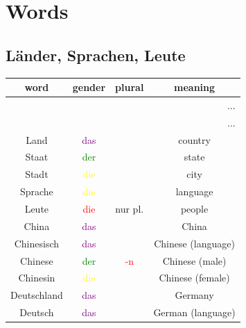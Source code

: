 \chapter{Words}
\section{Länder, Sprachen, Leute}
\begin{center}
    \begin{longtable} {|c|c|c|c|}
        \hline
        \rowcolor{gray}
        word           & gender                    & plural              & meaning              \\
        \hline
        \endfirsthead
        \multicolumn{4}{r}{...}                                                                 \\
        \hline
        \endhead
        \hline
        \multicolumn{4}{r}{...}                                                                 \\
        \endfoot
        \hline
        \endlastfoot
        \hline
        Land           & \textcolor{purple}{das}   &                     & country              \\
        Staat          & \textcolor{green}{der}    &                     & state                \\
        Stadt          & \textcolor{yellow}{die}   &                     & city                 \\
        Sprache        & \textcolor{yellow}{die}   &                     & language             \\
        Leute          & \textcolor{red}{die}      & nur pl.             & people               \\
        \hline
        China          & \textcolor{purple}{das}   &                     & China                \\
        Chinesisch     & \textcolor{purple}{das}   &                     & Chinese (language)   \\
        Chinese        & \textcolor{green}{der}    & \textcolor{red}{-n} & Chinese (male)       \\
        Chinesin       & \textcolor{yellow}{die}   &                     & Chinese (female)     \\
        \hline
        Deutschland    & \textcolor{purple}{das}   &                     & Germany              \\
        Deutsch        & \textcolor{purple}{das}   &                     & German (language)    \\

\end{longtable}
\end{center}
